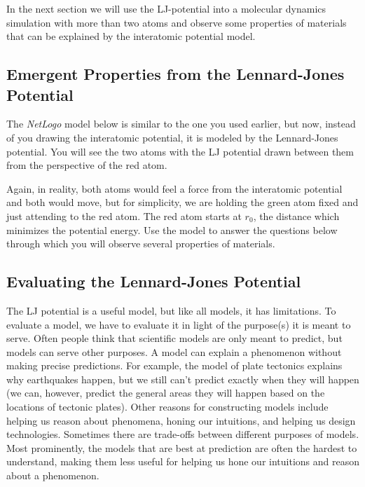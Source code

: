 \documentclass{book}
\begin{document}
In the next section we will use the LJ-potential into a molecular dynamics
simulation with more than two atoms and observe some properties of materials
that can be explained by the interatomic potential model.

\hypertarget{emergent-properties-from-the-lennard-jones-potential}{%
\subsection{Emergent Properties from the Lennard-Jones
Potential}\label{emergent-properties-from-the-lennard-jones-potential}}

The \emph{NetLogo} model below is similar to the one you used earlier, but
now, instead of you drawing the interatomic potential, it is modeled by the
Lennard-Jones potential. You will see the two atoms with the LJ potential
drawn between them from the perspective of the red atom.

Again, in reality, both atoms would feel a force from the interatomic
potential and both would move, but for simplicity, we are holding the green
atom fixed and just attending to the red atom. The red atom starts at \(r_0\),
the distance which minimizes the potential energy. Use the model to answer the
questions below through which you will observe several properties of
materials.

\hypertarget{evaluating-the-lennard-jones-potential}{%
\subsection{Evaluating the Lennard-Jones
Potential}\label{evaluating-the-lennard-jones-potential}}

The LJ potential is a useful model, but like all models, it has limitations.
To evaluate a model, we have to evaluate it in light of the purpose(s) it is
meant to serve. Often people think that scientific models are only meant to
predict, but models can serve other purposes. A model can explain a phenomenon
without making precise predictions. For example, the model of plate tectonics
explains why earthquakes happen, but we still can't predict exactly when they
will happen (we can, however, predict the general areas they will happen based
on the locations of tectonic plates). Other reasons for constructing models
include helping us reason about phenomena, honing our intuitions, and helping
us design technologies. Sometimes there are trade-offs between different
purposes of models. Most prominently, the models that are best at prediction
are often the hardest to understand, making them less useful for helping us
hone our intuitions and reason about a phenomenon.
\end{document}
